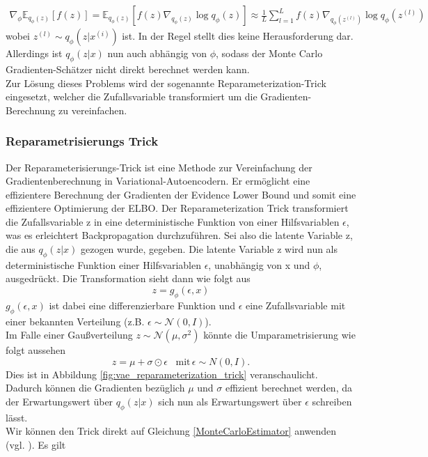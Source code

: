 \documentclass[%
thesis=student,%
coverpage=false,%
titlepage=false,%
headmarks=true, %
german,%
font=libertine, %
math=newpxtx, %
BCOR=5mm,%
coverBCOR=11mm%
]{tumbook}
\theoremstyle{break}
\begin{document}
\begin{align}
 \nabla_\phi \mathbb{E}_{q_\phi(z)}[f(z)]= \mathbb{E}_{q_\phi(z)}[f(z)\nabla_{q_\phi(z)}\log q_\phi(z)] \approx \frac{1}{L} \sum_{l=1}^{L}f(z)\nabla_{q_\phi(z^{(l)})}\log q_\phi(z^{(l)}) \label{MonteCarloEstimator}
\end{align}
wobei $z^{(l)} \sim q_\phi(z|x^{(i)})$ ist. 
In der Regel stellt dies keine Herausforderung dar. Allerdings ist $q_\phi(z|x)$ nun auch abhängig von  $\phi$, sodass der Monte Carlo Gradienten-Schätzer nicht direkt berechnet werden kann. \\
Zur Lösung dieses Problems wird der sogenannte Reparameterization-Trick eingesetzt, welcher die Zufallsvariable transformiert um die Gradienten-Berechnung zu vereinfachen.  
\subsubsection{Reparametrisierungs Trick}
Der Reparameterisierungs-Trick ist eine Methode zur Vereinfachung der Gradientenberechnung in Variational-Autoencodern. Er ermöglicht eine effizientere Berechnung der Gradienten der Evidence Lower Bound und somit eine effizientere Optimierung der ELBO. Der Reparameterization Trick transformiert die Zufallsvariable z in eine deterministische Funktion von einer Hilfsvariablen $\epsilon$, was es erleichtert Backpropagation durchzuführen.
Sei also die latente Variable z, die aus $q_\phi(z|x)$ gezogen wurde, gegeben. Die latente Variable z wird nun als deterministische Funktion einer Hilfsvariablen $\epsilon$, unabhängig von x und $\phi$, ausgedrückt. 
Die Transformation sieht dann wie folgt aus
$$ z = g_\phi(\epsilon, x)$$
$g_\phi(\epsilon,x) $ ist dabei eine differenzierbare Funktion und $\epsilon$ eine Zufallsvariable mit einer bekannten Verteilung (z.B. $\epsilon \sim \mathcal{N}(0,I)$).\\
Im Falle einer Gaußverteilung $z \sim \mathcal{N}(\mu, \sigma^2)$ könnte die Umparametrisierung wie folgt aussehen 
$$z=\mu + \sigma \odot \epsilon \hspace{10pt}\text{mit} \hspace{2pt} \epsilon\sim N(0,I).$$ Dies ist in  Abbildung \ref{fig:vae_reparameterization_trick} veranschaulicht.
Dadurch können die Gradienten bezüglich $\mu$ und $\sigma$ effizient berechnet werden, da der Erwartungswert über $q_\phi(z|x)$ sich nun als Erwartungswert über $\epsilon$ schreiben lässt.
\\
Wir können den Trick direkt auf Gleichung \ref{MonteCarloEstimator} anwenden (vgl. \cite{MonteCarloEstimation}). Es gilt
\end{document}
